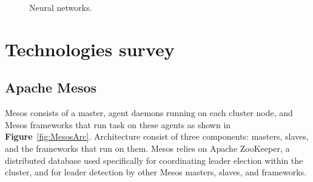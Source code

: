 \documentclass[12pt,oneside,openright,a4paper]{cpe-english-project}
\begin{document}
\begin{figure}[!h]\centering
  \setlength{\fboxrule}{0mm} %
  \setlength{\fboxsep}{0cm}
  \caption{Neural networks.}\label{fig:NN}
\end{figure}

\newpage

\section{Technologies survey}  

\subsection{Apache Mesos}
Mesos consists of a master, agent daemons running on each cluster node, and Mesos frameworks that run task on these agents as shown in \textbf{Figure}~\ref{fig:MesosArc}. Architecture consist of three components: masters, slaves, and the frameworks that run on them. Mesos relies on Apache ZooKeeper, a distributed database used specifically for coordinating leader election within the cluster, and for leader detection by other Mesos masters, slaves, and frameworks. \cite{mesosInAction}
\end{document}
